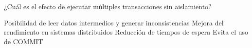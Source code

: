 \question[1] ¿Cuál es el efecto de ejecutar múltiples transacciones sin aislamiento?
\begin{choices}
\CorrectChoice Posibilidad de leer datos intermedios y generar inconsistencias
\choice Mejora del rendimiento en sistemas distribuidos
\choice Reducción de tiempos de espera
\choice Evita el uso de COMMIT
\end{choices}